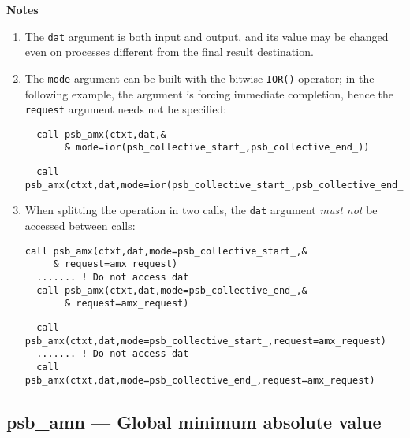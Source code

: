 {\par\noindent\large\bfseries Notes}
\begin{enumerate}
\item The \verb|dat| argument is both input and output, and its
  value may be changed even on processes different from the final
  result destination.
\item The \verb|mode| argument can be built with the bitwise
  \verb|IOR()| operator; in the following example, the   argument is
  forcing immediate completion, hence the \verb|request| argument
  needs not be specified: 
\ifpdf
\begin{verbatim}
  call psb_amx(ctxt,dat,&
       & mode=ior(psb_collective_start_,psb_collective_end_))
\end{verbatim}
\else
\begin{center}
    \begin{minipage}[tl]{0.9\textwidth}
\begin{verbatim} 
  call psb_amx(ctxt,dat,mode=ior(psb_collective_start_,psb_collective_end_))
\end{verbatim}
    \end{minipage}
  \end{center}
\fi
  
\item When splitting the operation in two calls, the \verb|dat|
  argument  \emph{must not} be accessed between calls:
\ifpdf
\begin{verbatim}
call psb_amx(ctxt,dat,mode=psb_collective_start_,&
     & request=amx_request)
  ....... ! Do not access dat 
  call psb_amx(ctxt,dat,mode=psb_collective_end_,&
       & request=amx_request)
\end{verbatim}
\else
\begin{center}
    \begin{minipage}[tl]{0.9\textwidth}
\begin{verbatim} 
  call psb_amx(ctxt,dat,mode=psb_collective_start_,request=amx_request)
  ....... ! Do not access dat 
  call psb_amx(ctxt,dat,mode=psb_collective_end_,request=amx_request)
\end{verbatim}
    \end{minipage}
  \end{center}
\fi
\end{enumerate}

\clearpage\subsection{psb\_amn --- Global minimum absolute value}

